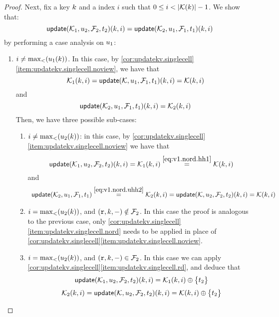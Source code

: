 \begin{proof}
Next, fix a key $k$ and a index $i$ such that $0 \leq i < \lvert  \mathcal{K}(k)  \rvert - 1$. 
We show that:
\[ 
    \updateKV(\mkvs_1,\vi_2,\fp_2,\txid_2)(\key, i) = \updateKV(\mkvs_2, \vi_1, \fp_1, \txid_1)(\key, i)
\]
by performing a case analysis on $u_1$: 
\begin{enumerate}
    \item $i \neq \max_{<}(u_1(k))$. 
In this case, by \cref{cor:updatekv.singlecell}\cref{item:updatekv.singlecell.noview}, 
we have that 
\begin{equation}
\mkvs_1(\key, i) = \updateKV(\mkvs, \vi_1, \fp_1, \txid_1)(\key, i) = \mkvs(\key, i)
\label{eq:v1.nord.hh1}
\end{equation}
and 
\begin{equation}
\updateKV(\mkvs_2, \vi_1, \fp_1, \txid_1)(\key, i) = \mkvs_2(\key, i)
\label{eq:v1.nord.uhh2}
\end{equation}
Then, we have three possible sub-cases: 
\begin{enumerate}
    \item $i \neq \max_{<}(u_2(k))$: in this case, by \cref{cor:updatekv.singlecell}\cref{item:updatekv.singlecell.noview} we have that 
\[\updateKV(\mkvs_1, \vi_2, \fp_2, \txid_2)(\key, i) = 
\mkvs_1(\key, i) \stackrel{\cref{eq:v1.nord.hh1}}{=} \mkvs(\key, i)
\]
and
\[
\begin{array}{l}
\updateKV(\mkvs_2, \vi_1, \fp_1, \txid_1) \stackrel{\cref{eq:v1.nord.uhh2}}{=} \mkvs_2(\key,i) = 
\updateKV(\mkvs, \vi_2, \fp_2, \txid_2)(\key, i) = \mkvs(\key, i)
\end{array}
\]
\item $i = \max_{<}(u_2(k))$, and $(\textnormal{\texttt r}, k, -) \notin \mathcal{F}_2$. In this case the proof is analogous to the previous case, 
only \cref{cor:updatekv.singlecell}\cref{item:updatekv.singlecell.nord} needs to be applied in place 
of \cref{cor:updatekv.singlecell}\cref{item:updatekv.singlecell.noview}.
\item $i = \max_{<}(u_2(k))$, and $(\textnormal{\texttt r}, k, -) \in \mathcal{F}_2$. In this case we can apply \cref{cor:updatekv.singlecell}\cref{item:updatekv.singlecell.rd}, 
and deduce that 
\begin{equation}
\updateKV(\mkvs_1, \vi_2, \fp_2, \txid_2)(\key, i) = \mkvs_1(\key, i) \oplus \Set{\txid_2}
\label{eq:v1.nord.v2.rd.uhh1}
\end{equation}
\begin{equation}
\mkvs_2(\key, i) = \updateKV(\mkvs, \vi_2, \fp_2, \txid_2)(\key, i) = \mkvs(\key,i) \oplus \Set{\txid_2}
\label{eq:v1.nord.v2.rd.hh2}

\end{equation}
\end{enumerate}
\end{enumerate}
\end{proof}
